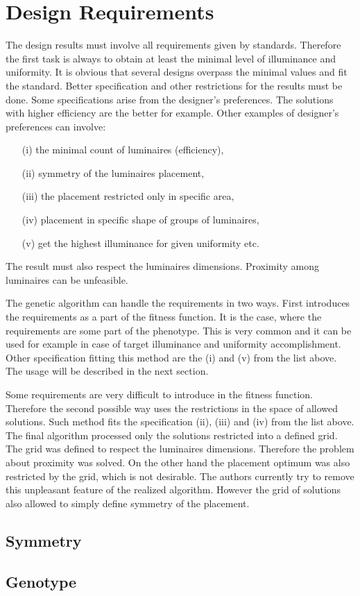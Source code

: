 \section{Design Requirements}
The design results must involve all requirements given by standards. Therefore the first task is always to obtain at least the minimal level of illuminance and uniformity. It is obvious that several designs overpass the minimal values and fit the standard. Better specification and other restrictions for the results must be done. Some specifications arise from the designer's preferences. The solutions with higher efficiency are the better for example. Other examples of designer's preferences can involve:

\begin{enumerate}
	\item[(i)] the minimal count of luminaires (efficiency),
	\item[(ii)] symmetry of the luminaires placement,
	\item[(iii)] the placement restricted only in specific area,
	\item[(iv)] placement in specific shape of groups of luminaires,
	\item[(v)] get the highest illuminance for given uniformity etc.
\end{enumerate}

The result must also respect the luminaires dimensions. Proximity among luminaires can be unfeasible.

The genetic algorithm can handle the requirements in two ways. First introduces the requirements as a part of the fitness function. It is the case, where the requirements are some part of the phenotype. This is very common and it can be used for example in case of target illuminance and uniformity accomplishment. Other specification fitting this method are the (i) and (v) from the list above. The usage will be described in the next section. 

Some requirements are very difficult to introduce in the fitness function. Therefore the second possible way uses the restrictions in the space of allowed solutions. Such method fits the specification (ii), (iii) and (iv) from the list above. The final algorithm processed only the solutions restricted into a defined grid. The grid was defined to respect the luminaires dimensions. Therefore the problem about proximity was solved. On the other hand the placement optimum was also restricted by the grid, which is not desirable. The authors currently try to remove this unpleasant feature of the realized algorithm. However the grid of solutions also allowed to simply define symmetry of the placement.

\subsection{Symmetry}

\subsection{Genotype}
